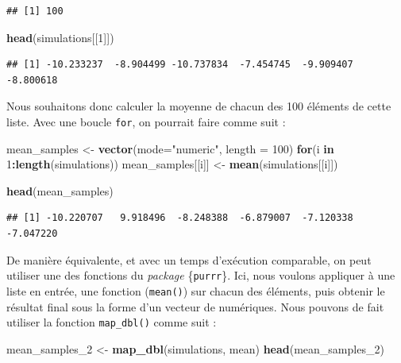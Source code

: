 \documentclass[
  11pt,
]{book}
\newenvironment{Shaded}{\begin{snugshade}}{\end{snugshade}}
\newcommand{\ControlFlowTok}[1]{\textcolor[rgb]{0.13,0.29,0.53}{\textbf{#1}}}
\newcommand{\DataTypeTok}[1]{\textcolor[rgb]{0.13,0.29,0.53}{#1}}
\newcommand{\DecValTok}[1]{\textcolor[rgb]{0.00,0.00,0.81}{#1}}
\newcommand{\KeywordTok}[1]{\textcolor[rgb]{0.13,0.29,0.53}{\textbf{#1}}}
\newcommand{\NormalTok}[1]{#1}
\newcommand{\OperatorTok}[1]{\textcolor[rgb]{0.81,0.36,0.00}{\textbf{#1}}}
\newcommand{\StringTok}[1]{\textcolor[rgb]{0.31,0.60,0.02}{#1}}
\numberwithin{equation}{section}
\numberwithin{countremarque}{section}
\begin{document}
\begin{lstlisting}
## [1] 100
\end{lstlisting}

\begin{Shaded}
\begin{Highlighting}[]
\KeywordTok{head}\NormalTok{(simulations[[}\DecValTok{1}\NormalTok{]])}
\end{Highlighting}
\end{Shaded}

\begin{lstlisting}
## [1] -10.233237  -8.904499 -10.737834  -7.454745  -9.909407  -8.800618
\end{lstlisting}

Nous souhaitons donc calculer la moyenne de chacun des 100 éléments de cette liste. Avec une boucle \texttt{for}, on pourrait faire comme suit :

\begin{Shaded}
\begin{Highlighting}[]
\NormalTok{mean\_samples \textless{}{-}}\StringTok{ }\KeywordTok{vector}\NormalTok{(}\DataTypeTok{mode=}\StringTok{"numeric"}\NormalTok{, }\DataTypeTok{length =} \DecValTok{100}\NormalTok{)}
\ControlFlowTok{for}\NormalTok{(i }\ControlFlowTok{in} \DecValTok{1}\OperatorTok{:}\KeywordTok{length}\NormalTok{(simulations)) }
\NormalTok{  mean\_samples[[i]] \textless{}{-}}\StringTok{ }\KeywordTok{mean}\NormalTok{(simulations[[i]])}

\KeywordTok{head}\NormalTok{(mean\_samples)}
\end{Highlighting}
\end{Shaded}

\begin{lstlisting}
## [1] -10.220707   9.918496  -8.248388  -6.879007  -7.120338  -7.047220
\end{lstlisting}

De manière équivalente, et avec un temps d'exécution comparable, on peut utiliser une des fonctions du \emph{package} \{\texttt{purrr}\}. Ici, nous voulons appliquer à une liste en entrée, une fonction (\texttt{mean()}) sur chacun des éléments, puis obtenir le résultat final sous la forme d'un vecteur de numériques. Nous pouvons de fait utiliser la fonction \texttt{map\_dbl()} comme suit :

\begin{Shaded}
\begin{Highlighting}[]
\NormalTok{mean\_samples\_}\DecValTok{2}\NormalTok{ \textless{}{-}}\StringTok{ }\KeywordTok{map\_dbl}\NormalTok{(simulations, mean)}
\KeywordTok{head}\NormalTok{(mean\_samples\_}\DecValTok{2}\NormalTok{)}
\end{Highlighting}
\end{Shaded}
\end{document}
